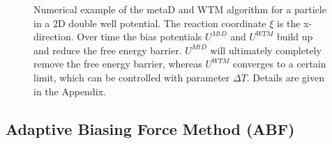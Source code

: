 \begin{figure}[H]
    \centering
    \caption{Numerical example of the metaD and WTM algorithm for a particle in a 2D double well potential. The reaction coordinate $\xi$ is the x-direction. Over time the bias potentials $U^{MtD}$ and $U^{WTM}$ build up and reduce the free energy barrier. $U^{MtD}$ will ultimately completely remove the free energy barrier, whereas $U^{WTM}$ converges to a certain limit, which can be controlled with parameter $\Delta T$. Details are given in the Appendix.}
\label{fig:metaD}%
\end{figure}

\subsection{Adaptive Biasing Force Method (ABF)}
\label{sec:ABF}

